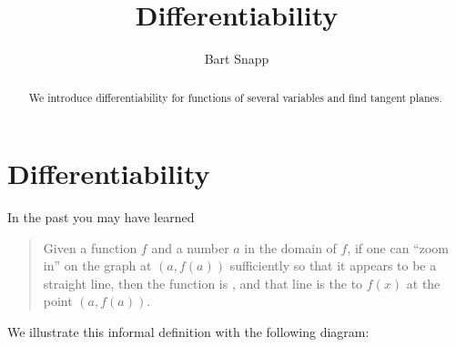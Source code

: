 \documentclass{ximera}
\author{Bart Snapp}
\title[Dig-In:]{Differentiability}
\begin{document}
\begin{abstract}
  We introduce differentiability for functions of several variables and find tangent planes.
\end{abstract}
\maketitle


\section{Differentiability}

In the past you may have learned
\begin{quote}
Given a function $f$ and a number $a$ in the domain of $f$, if one can
``zoom in'' on the graph at $(a, f(a))$ sufficiently so that it
appears to be a straight line, then the function is
, and that line is the  to
$f(x)$ at the point $(a,f(a))$.
\end{quote}
We illustrate this informal definition with the following diagram:
\end{document}
